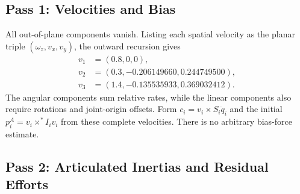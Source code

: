 \subsection{Pass 1: Velocities and Bias}
\label{subsec:pass1_example}

All out-of-plane components vanish. Listing each spatial velocity as the planar triple $(\omega_z,v_x,v_y)$, the outward recursion gives
\begin{equation}
 \begin{aligned}
 v_1&=(0.8,0,0),\\
 v_2&=(0.3,-0.206149660,0.244749500),\\
 v_3&=(1.4,-0.135535933,0.369032412).
 \end{aligned}
\end{equation}
The angular components sum relative rates, while the linear components also require rotations and joint-origin offsets. Form $c_i=v_i\times S_i\dot q_i$ and the initial $p_i^A=v_i\times^*I_i v_i$ from these complete velocities. There is no arbitrary bias-force estimate.

\subsection{Pass 2: Articulated Inertias and Residual Efforts}
\label{subsec:pass2_example}

